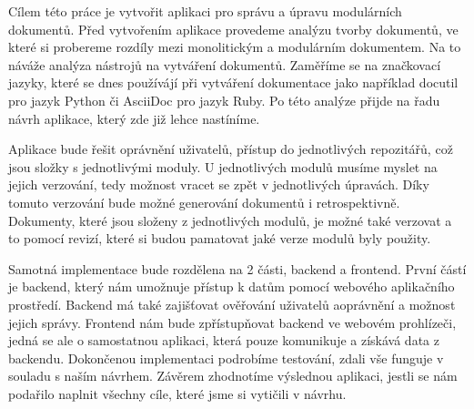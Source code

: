 Cílem této práce je vytvořit aplikaci pro správu a úpravu modulárních dokumentů. Před vytvořením aplikace provedeme analýzu tvorby dokumentů, ve které si probereme
rozdíly mezi monolitickým a modulárním dokumentem. Na to náváže analýza nástrojů na vytváření dokumentů. Zaměříme se na značkovací jazyky, které se dnes používájí při vytváření dokumentace
jako například docutil pro jazyk Python či AsciiDoc pro jazyk Ruby.
Po této analýze přijde na řadu návrh aplikace, který zde již lehce nastíníme.

Aplikace bude řešit oprávnění uživatelů, přístup do
jednotlivých repozitářů, což jsou složky s jednotlivými moduly. U jednotlivých modulů musíme myslet na jejich verzování, tedy možnost
vracet se zpět v jednotlivých úpravách. Díky tomuto verzování bude možné generování dokumentů i retrospektivně. Dokumenty, které jsou
složeny z jednotlivých modulů, je možné také verzovat a to pomocí revizí, které si budou pamatovat jaké verze modulů byly použity.

Samotná implementace bude rozdělena na 2 části, backend a frontend. První částí je backend, který nám umožnuje přístup k datům pomocí webového aplikačního
prostředí. Backend má také zajišťovat ověřování uživatelů a\linebreak oprávnění a možnost jejich správy. Frontend nám bude zpřístupňovat \mbox{backend}
ve webovém prohlízeči, jedná se ale o samostatnou aplikaci, která pouze komunikuje a získává data z backendu. Dokončenou implementaci podrobíme
testování, zdali vše funguje v souladu s naším návrhem. Závěrem zhodnotíme výslednou aplikaci, jestli se nám podařilo naplnit všechny cíle, které jsme
si vytičili v návrhu.